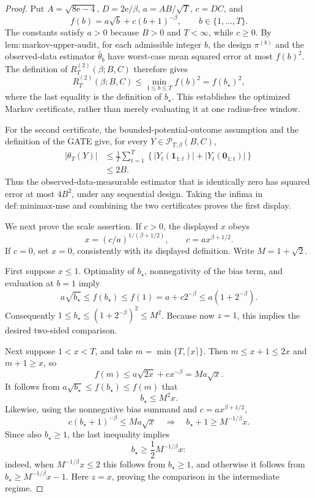 \documentclass{article}
\begin{document}
\begin{proof}
Put \(A=\sqrt{8\mathrm e-4}\), \(D=2\mathrm e/\beta\), \(a=AB/\sqrt T\), \(c=DC\), and
\[
 f(b)=a\sqrt b+c(b+1)^{-\beta},
 \qquad b\in\{1,\ldots,T\}.
\]
The constants satisfy \(a>0\) because \(B>0\) and \(T<\infty\), while \(c\ge0\).  By \(\mathrm{lem{:}markov\mbox{-}upper\mbox{-}audit}\), for each admissible integer \(b\), the design \(\pi^{(b)}\) and the observed-data estimator \(\widehat\theta_b\) have worst-case mean squared error at most \(f(b)^2\).  The definition of \(R_T^{(2)}(\beta;B,C)\) therefore gives
\[
 R_T^{(2)}(\beta;B,C)\le\min_{1\le b\le T}f(b)^2=f(b_\star)^2,
\]
where the last equality is the definition of \(b_\star\).  This establishes the optimized Markov certificate, rather than merely evaluating it at one radius-free window.

For the second certificate, the bounded-potential-outcome assumption and the definition of the GATE give, for every \(Y\in\mathcal P_{T,\beta}(B,C)\),
\[
 \begin{aligned}
 |\theta_T(Y)|
 &\le \frac1T\sum_{t=1}^T
 \left\{|Y_t(\mathbf1_{1:t})|+|Y_t(\mathbf0_{1:t})|\right\}\\
 &\le 2B.
 \end{aligned}
\]
Thus the observed-data-measurable estimator that is identically zero has squared error at most \(4B^2\), under any sequential design.  Taking the infima in \(\mathrm{def{:}minimax\mbox{-}mse}\) and combining the two certificates proves the first display.

We next prove the scale assertion.  If \(c>0\), the displayed \(x\) obeys
\[
 x=(c/a)^{1/(\beta+1/2)},
 \qquad c=a x^{\beta+1/2}.
\]
If \(c=0\), set \(x=0\), consistently with its displayed definition.  Write \(M=1+\sqrt2\).

First suppose \(x\le1\).  Optimality of \(b_\star\), nonnegativity of the bias term, and evaluation at \(b=1\) imply
\[
 a\sqrt{b_\star}\le f(b_\star)\le f(1)
 =a+c2^{-\beta}\le a(1+2^{-\beta}).
\]
Consequently \(1\le b_\star\le(1+2^{-\beta})^2\le M^2\).  Because now \(z=1\), this implies the desired two-sided comparison.

Next suppose \(1<x<T\), and take \(m=\min\{T,\lceil x\rceil\}\).  Then \(m\le x+1\le2x\) and \(m+1\ge x\), so
\[
 f(m)
 \le a\sqrt{2x}+cx^{-\beta}
 =M a\sqrt x.
\]
It follows from \(a\sqrt{b_\star}\le f(b_\star)\le f(m)\) that
\[
 b_\star\le M^2x.
\]
Likewise, using the nonnegative bias summand and \(c=ax^{\beta+1/2}\),
\[
 c(b_\star+1)^{-\beta}\le M a\sqrt x
 \quad\Longrightarrow\quad
 b_\star+1\ge M^{-1/\beta}x.
\]
Since also \(b_\star\ge1\), the last inequality implies
\[
 b_\star\ge\frac12M^{-1/\beta}x:
\]
indeed, when \(M^{-1/\beta}x\le2\) this follows from \(b_\star\ge1\), and otherwise it follows from \(b_\star\ge M^{-1/\beta}x-1\).  Here \(z=x\), proving the comparison in the intermediate regime.


\end{proof}
\end{document}
